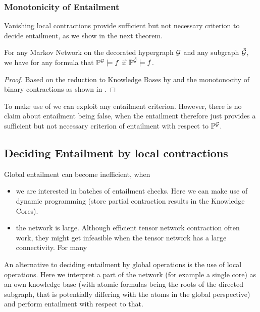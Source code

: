 \subsubsection{Monotonicity of Entailment}


Vanishing local contractions provide sufficient but not necessary criterion to decide entailment, as we show in the next theorem.

\begin{theorem}\label{the:monotonEntailment}
	For any Markov Network on the decorated hypergraph $\mathcal{G}$ and any subgraph $\tilde{\mathcal{G}}$, we have for any formula that $\mathbb{P}^{\mathcal{G}}\models f$ if $\mathbb{P}^{\tilde{\mathcal{G}}}\models f$.
\end{theorem}	
\begin{proof}
	Based on the reduction to Knowledge Bases by  and the monotonocity of binary contractions as shown in .
\end{proof}



\begin{remark}
	To make use of  we can exploit any entailment criterion.
	However, there is no claim about entailment being false, when the entailment 
	 therefore just provides a sufficient but not necessary criterion of entailment with respect to $\mathbb{P}^{\mathcal{G}}$.
\end{remark}



\subsection{Deciding Entailment by local contractions}\label{subsec:LocalEntailment}


Global entailment can become inefficient, when
\begin{itemize}
	\item we are interested in batches of entailment checks. Here we can make use of dynamic programming (store partial contraction results in the Knowledge Cores).
	\item the network is large. Although efficient tensor network contraction often work, they might get infeasible when the tensor network has a large connectivity. For many 
\end{itemize}
An alternative to deciding entailment by global operations is the use of local operations.
Here we interpret a part of the network (for example a single core) as an own knowledge base (with atomic formulas being the roots of the directed subgraph, that is potentially differing with the atoms in the global perspective) and perform entailment with respect to that.

